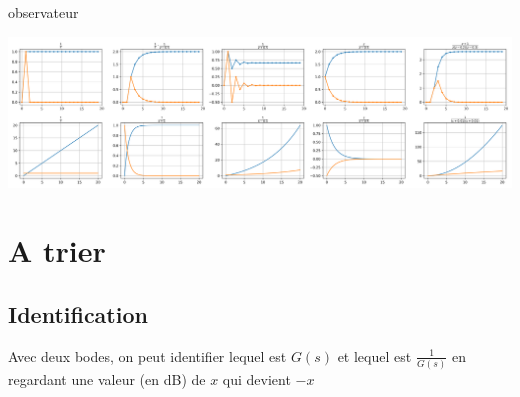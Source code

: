 \documentclass[]{article}
\begin{document}
\begin{multicols}{3}




 {observateur}

\end{multicols}
\pagebreak
\begin{center}
\includegraphics[width=\textwidth]{Allures.png}
\end{center}


\section{A trier}
\subsection{Identification}
Avec deux bodes, on peut identifier lequel est $G(s)$ et lequel est $\frac{1}{G(s)}$ en regardant une valeur (en dB) de $x$ qui devient $-x$
\end{document}
